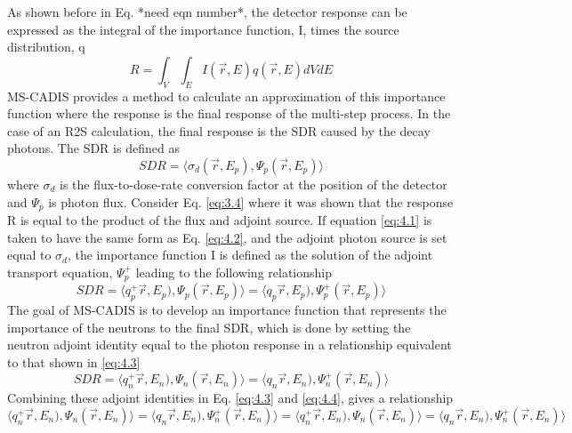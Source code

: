 As shown before in Eq. *need eqn number*, the detector response can be
expressed as the integral of the importance function, I, times the source
distribution, q
\begin{equation} \label{eq:4.1}
R = \int_{V}\int_{E} 
    I(\overrightarrow{r}, E)
    q(\overrightarrow{r}, E)
    dV dE
\end{equation}
MS-CADIS provides a method to calculate an approximation of this importance function
where the response is the final response of the multi-step process.  In the case
of an R2S calculation, the final response is the SDR caused by the decay
photons.  The SDR is defined as 
\begin{equation} \label{eq:4.2}
  SDR =  \langle \sigma_{d}(\overrightarrow{r},E_{p}),
  \Psi_{p}(\overrightarrow{r}, E_{p}) \rangle
\end{equation}
where $\sigma_{d}$ is the flux-to-dose-rate conversion factor at the position of
the detector and $\Psi_{p}$ is photon flux.
Consider Eq. \ref{eq:3.4} where it was shown that the response R is
equal to the product of the flux and adjoint source.  
If equation \ref{eq:4.1}
is taken to have the same form as Eq. \ref{eq:4.2}, and the adjoint photon
source is set equal to $\sigma_d$, the importance function I
is defined as the solution of the adjoint transport equation, $\Psi_{p}^{+}$
leading to the following relationship
\begin{equation} \label{eq:4.3}
  SDR =  \langle q_{p}^{+}\overrightarrow{r},E_{p}),
  \Psi_{p}(\overrightarrow{r}, E_{p}) \rangle 
  = \langle q_{p}\overrightarrow{r},E_{p}),
  \Psi_{p}^{+}(\overrightarrow{r}, E_{p}) \rangle 
\end{equation}
The goal of MS-CADIS is to develop an importance function that represents the
importance of the neutrons to the final SDR, which is done by setting the
neutron adjoint identity equal to the photon response in a relationship
equivalent to that shown in \ref{eq:4.3}
\begin{equation} \label{eq:4.4}
  SDR =  \langle q_{n}^{+}\overrightarrow{r},E_{n}),
  \Psi_{n}(\overrightarrow{r}, E_{n}) \rangle 
  = \langle q_{n}\overrightarrow{r},E_{n}),
  \Psi_{n}^{+}(\overrightarrow{r}, E_{n}) \rangle 
\end{equation}
Combining these adjoint identities in Eq. \ref{eq:4.3} and \ref{eq:4.4}, 
gives a relationship
\begin{equation} \label{eq:4.5}
  \langle q_{n}^{+}\overrightarrow{r},E_{n}),
  \Psi_{n}(\overrightarrow{r}, E_{n}) \rangle 
  = \langle q_{n}\overrightarrow{r},E_{n}),
  \Psi_{n}^{+}(\overrightarrow{r}, E_{n}) \rangle 
  =  \langle q_{n}^{+}\overrightarrow{r},E_{n}),
  \Psi_{n}(\overrightarrow{r}, E_{n}) \rangle 
  = \langle q_{n}\overrightarrow{r},E_{n}),
  \Psi_{n}^{+}(\overrightarrow{r}, E_{n}) \rangle 
\end{equation}



 
